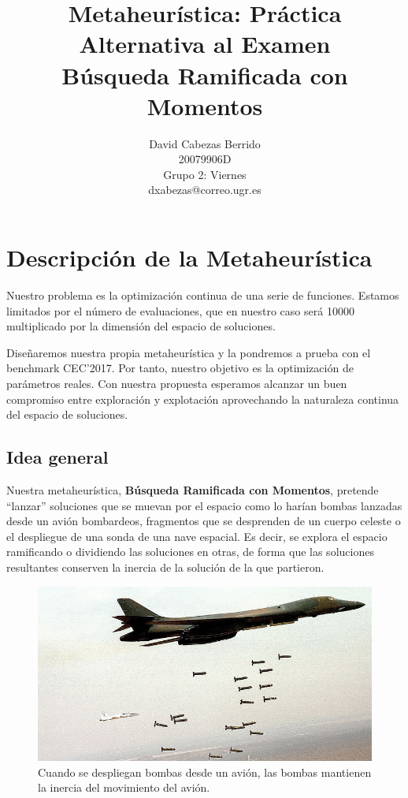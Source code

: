\documentclass{article}
\title{\Huge Metaheurística: Práctica Alternativa al Examen \\ Búsqueda Ramificada con Momentos \vspace{10mm}}
\author{\huge David Cabezas Berrido \vspace{10mm} \\
	\huge 20079906D \vspace{10mm} \\  
  \huge Grupo 2: Viernes \vspace{10mm} \\ 
  \huge dxabezas@correo.ugr.es \vspace{10mm}}
\begin{document}
\maketitle
\newpage
\tableofcontents
\newpage

\section{Descripción de la Metaheurística}

Nuestro problema es la optimización continua de una serie de funciones. Estamos limitados por el número de evaluaciones, que en nuestro
caso será 10000 multiplicado por la dimensión del espacio de soluciones.

Diseñaremos nuestra propia metaheurística y la pondremos a prueba con el benchmark CEC'2017. Por tanto, nuestro objetivo es la optimización de parámetros
reales. Con nuestra propuesta esperamos alcanzar un buen compromiso entre exploración y explotación aprovechando la naturaleza continua del espacio
de soluciones.

\subsection{Idea general}
Nuestra metaheurística, \textbf{Búsqueda Ramificada con Momentos}, pretende ``lanzar'' soluciones que se muevan por el espacio como lo harían bombas
lanzadas desde un avión bombardeos, fragmentos que se desprenden de un cuerpo celeste o el despliegue de una sonda de una nave espacial.
Es decir, se explora el espacio ramificando o dividiendo las soluciones en otras, de
forma que las soluciones resultantes conserven la inercia de la solución de la que partieron.

\begin{figure}[H]
	\centering
	\includegraphics[width=140mm]{imgs/bombs}
	\caption{Cuando se despliegan bombas desde un avión, las bombas mantienen la inercia del movimiento del avión.}
\end{figure}
\end{document}
